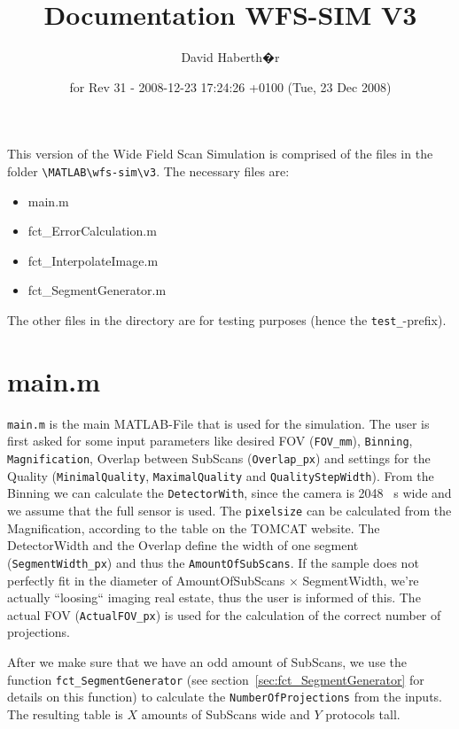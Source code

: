 \documentclass{scrartcl}
\title{Documentation WFS-SIM V3}
\author{David Haberth�r}
\date{for Rev 31 - 2008-12-23 17:24:26 +0100 (Tue, 23 Dec 2008)}
\begin{document}
\maketitle

This version of the Wide Field Scan Simulation is comprised of the files in the folder \verb+\MATLAB\wfs-sim\v3+. The necessary files are:

\begin{itemize}
	\item main.m
	\item fct\_ErrorCalculation.m
	\item fct\_InterpolateImage.m
	\item fct\_SegmentGenerator.m
\end{itemize}

The other files in the directory are for testing purposes (hence the \verb+test_+-prefix).

\section{main.m}
\label{sec:main}
\verb+main.m+ is the main MATLAB-File that is used for the simulation. The user is first asked for some input parameters like desired FOV (\verb+FOV_mm+), \verb+Binning+, \verb+Magnification+, Overlap between SubScans (\verb+Overlap_px+) and settings for the Quality (\verb+MinimalQuality+, \verb+MaximalQuality+ and \verb+QualityStepWidth+). From the Binning we can calculate the \verb+DetectorWith+, since the camera is 2048~	s wide and we assume that the full sensor is used. The \verb+pixelsize+ can be calculated from the Magnification, according to the table on the TOMCAT website. The DetectorWidth and the Overlap define the width of one segment (\verb+SegmentWidth_px+) and thus the \verb+AmountOfSubScans+. If the sample does not perfectly fit in the diameter of AmountOfSubScans $\times$ SegmentWidth, we're actually ``loosing`` imaging real estate, thus the user is informed of this. The actual FOV (\verb+ActualFOV_px+) is used for the calculation of the correct number of projections.

After we make sure that we have an odd amount of SubScans, we use the function \verb+fct_SegmentGenerator+ (see section~\ref{sec:fct_SegmentGenerator} for details on this function) to calculate the \verb+NumberOfProjections+ from the inputs. The resulting table is $X$ amounts of SubScans wide and $Y$ protocols tall.
\end{document}
